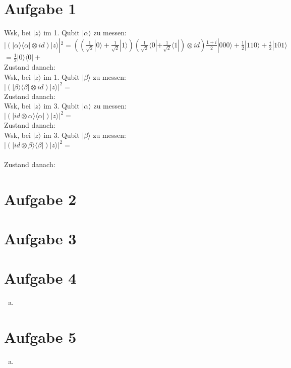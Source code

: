 \documentclass[a4paper]{scrartcl}
\begin{document}
\section*{Aufgabe 1}
Wsk, bei $|z\rangle$ im 1. Qubit $|\alpha\rangle$ zu messen:\\
$|(|\alpha\rangle\langle\alpha|\otimes id)|z\rangle|^2= ((\frac{1}{\sqrt{2}}|0\rangle+\frac{1}{\sqrt{2}}|1\rangle)(\frac{1}{\sqrt{2}}\langle 0|+\frac{1}{\sqrt{2}}\langle 1|)\otimes id )\frac{1+i}{2}|000\rangle+\frac{1}{2}|110\rangle+\frac{i}{2}|101\rangle$\\
$= \frac{1}{2}|0\rangle\langle 0|+$\\
Zustand danach:\\
Wsk, bei $|z\rangle$ im 1. Qubit $|\beta\rangle$ zu messen:\\
$|(|\beta\rangle\langle\beta|\otimes id)|z\rangle|^2= $\\
Zustand danach:\\
Wsk, bei $|z\rangle$ im 3. Qubit $|\alpha\rangle$ zu messen:\\
$|(|id\otimes\alpha\rangle\langle\alpha|)|z\rangle|^2= $\\
Zustand danach:\\
Wsk, bei $|z\rangle$ im 3. Qubit $|\beta\rangle$ zu messen:\\
$|(|id\otimes\beta\rangle\langle\beta|)|z\rangle|^2= $\\\\
Zustand danach:\\
\newpage
\section*{Aufgabe 2}


\newpage
\section*{Aufgabe 3}

\newpage
\section*{Aufgabe 4}
\begin{enumerate}[a)]

\item

\end{enumerate}
\newpage
\section*{Aufgabe 5}
\begin{enumerate}[a)]

\item
\end{enumerate}
\end{document}
